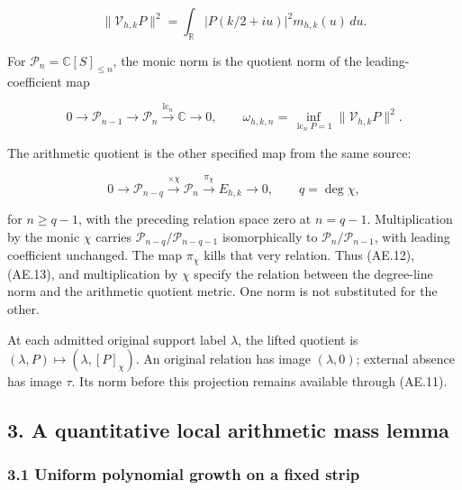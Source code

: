 \[
 \|\mathcal V_{h,k}P\|^2
 =\int_{\mathbb R}|P(k/2+iu)|^2m_{h,k}(u)\,du.                          \tag{AE.11}\label{AE.eq.11}
\]

For \(\mathcal P_n=\mathbb C[S]_{\le n}\), the monic norm is the
quotient norm of the leading-coefficient map

\[
 0\longrightarrow\mathcal P_{n-1}\longrightarrow\mathcal P_n
 \xrightarrow{\operatorname{lc}_n}\mathbb C\longrightarrow0,
 \qquad
 \omega_{h,k,n}=\inf_{\operatorname{lc}_nP=1}\|\mathcal V_{h,k}P\|^2.
                                                                         \tag{AE.12}\label{AE.eq.12}
\]

The arithmetic quotient is the other specified map from the same source:

\[
 0\longrightarrow\mathcal P_{n-q}
 \xrightarrow{\times\chi}\mathcal P_n
 \xrightarrow{\pi_\chi}E_{h,k}\longrightarrow0,\qquad q=\deg\chi,
                                                                         \tag{AE.13}\label{AE.eq.13}
\]

for \(n\ge q-1\), with the preceding relation space zero at \(n=q-1\).
Multiplication by the monic \(\chi\) carries
\(\mathcal P_{n-q}/\mathcal P_{n-q-1}\) isomorphically to
\(\mathcal P_n/\mathcal P_{n-1}\), with leading coefficient unchanged.
The map \(\pi_\chi\) kills that very relation. Thus (AE.12), (AE.13), and
multiplication by \(\chi\) specify the relation between the degree-line
norm and the arithmetic quotient metric. One norm is not substituted for
the other.

At each admitted original support label \(\lambda\), the lifted quotient
is \((\lambda,P)\mapsto(\lambda,[P]_\chi)\). An original relation has
image \((\lambda,0)\); external absence has image \(\tau\). Its norm
before this projection remains available through (AE.11).

\subsection*{3. A quantitative local arithmetic mass
lemma}
\label{AE.a-quantitative-local-arithmetic-mass-lemma}

\subsubsection*{3.1 Uniform polynomial growth on a fixed
strip}
\label{AE.uniform-polynomial-growth-on-a-fixed-strip}

